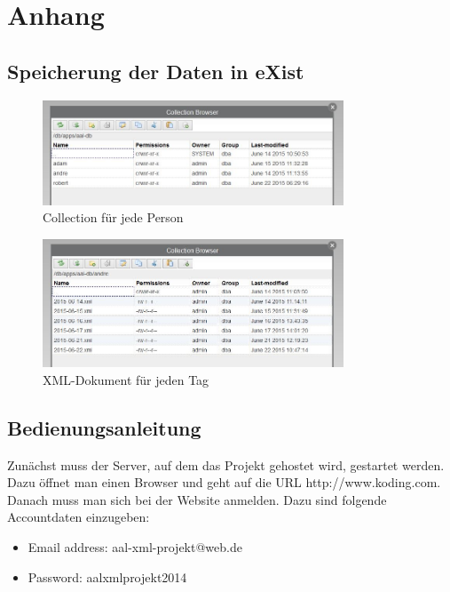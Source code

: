 \appendix

\section{Anhang}
\subsection{Speicherung der Daten in eXist}
\begin{figure}[H]
	\centering
		\includegraphics[width=0.8\textwidth]{images/collections1.jpg}
		\caption{Collection für jede Person} 
		\label{collection1}
	\centering
\end{figure}
\begin{figure}[H]
	\centering
		\includegraphics[width=0.8\textwidth]{images/collections2.jpg}
		\caption{XML-Dokument für jeden Tag} 
		\label{collection2}
	\centering
\end{figure}

\subsection{Bedienungsanleitung}
Zunächst muss der Server, auf dem das Projekt gehostet wird, gestartet werden. Dazu öffnet man einen Browser und geht auf die URL http://www.koding.com. Danach muss man sich bei der Website anmelden. Dazu sind folgende Accountdaten einzugeben:

\begin{itemize}
	\item Email address: aal-xml-projekt@web.de
	\item Password: aalxmlprojekt2014
\end{itemize}

